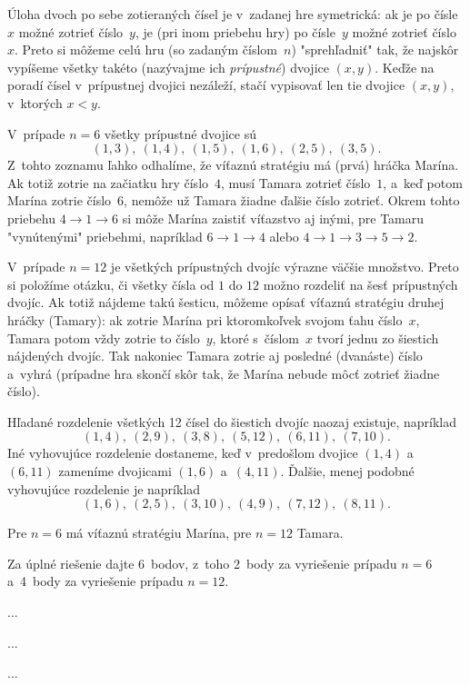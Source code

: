{%
Úloha dvoch po sebe zotieraných čísel je v~zadanej hre symetrická:
ak je po čísle~$x$ možné zotrieť číslo~$y$, je (pri inom priebehu
hry) po čísle~$y$ možné zotrieť číslo~$x$. Preto si môžeme
celú hru (so zadaným číslom~$n$) "sprehľadniť" tak,
že najskôr vypíšeme všetky takéto
(nazývajme ich {\it prípustné\/}) dvojice $(x,y)$.
Keďže na poradí čísel v~prípustnej dvojici nezáleží, stačí
vypisovať len tie dvojice $(x,y)$, v~ktorých $x<y$.

\smallskip
V~prípade $n=6$ všetky prípustné dvojice sú
$$
(1,3),\ (1,4),\ (1,5),\ (1,6),\ (2,5),\  (3,5).
$$
Z~tohto zoznamu ľahko odhalíme, že víťaznú stratégiu
má (prvá) hráčka Marína. Ak totiž zotrie na začiatku hry číslo~$4$,
musí Tamara zotrieť číslo~$1$, a~keď potom Marína zotrie číslo~$6$,
nemôže už Tamara žiadne ďalšie číslo
zotrieť. Okrem tohto priebehu $4\to1\to6$ si môže Marína zaistiť
víťazstvo aj inými, pre Tamaru  "vynútenými" priebehmi,
napríklad $6\to1\to4$ alebo $4\to1\to3\to5\to2$.

\smallskip
V~prípade $n=12$ je všetkých prípustných dvojíc výrazne
väčšie množstvo. Preto si položíme otázku, či
všetky čísla od $1$ do $12$ možno rozdeliť na šesť prípustných dvojíc.
Ak totiž nájdeme takú šesticu, môžeme opísať víťaznú stratégiu druhej hráčky
(Tamary): ak zotrie Marína pri ktoromkoľvek svojom ťahu číslo~$x$,
Tamara potom vždy zotrie to číslo~$y$, ktoré s~číslom~$x$ tvorí jednu
zo šiestich nájdených dvojíc. Tak nakoniec Tamara zotrie aj posledné
(dvanáste) číslo a~vyhrá (prípadne hra skončí skôr tak, že Marína nebude môcť zotrieť žiadne číslo).

Hľadané rozdelenie všetkých 12 čísel do šiestich dvojíc naozaj
existuje, napríklad
$$
(1,4),\ (2,9),\ (3,8),\ (5,12),\ (6,11),\ (7,10).
$$
Iné vyhovujúce rozdelenie dostaneme, keď v~predošlom dvojice
$(1,4)$ a~$(6,11)$ zameníme dvojicami $(1,6)$ a~$(4,11)$. Ďalšie,
menej podobné vyhovujúce rozdelenie je napríklad
$$
(1,6),\ (2,5),\ (3,10),\ (4,9),\ (7,12),\ (8,11).
$$

\odpoved
Pre $n=6$ má víťaznú stratégiu Marína, pre $n=12$
Tamara.

\nobreak\medskip\petit\noindent
Za úplné riešenie dajte 6~bodov, z~toho 2~body za vyriešenie prípadu
$n=6$ a~4~body za vyriešenie prípadu $n=12$.
\endpetit
\bigbreak
}

{%
...}

{%
...}

{%
...}

